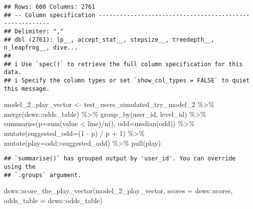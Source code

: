 \documentclass[
]{article}
\newenvironment{Shaded}{\begin{snugshade}}{\end{snugshade}}
\newcommand{\AttributeTok}[1]{\textcolor[rgb]{0.77,0.63,0.00}{#1}}
\newcommand{\DecValTok}[1]{\textcolor[rgb]{0.00,0.00,0.81}{#1}}
\newcommand{\FunctionTok}[1]{\textcolor[rgb]{0.00,0.00,0.00}{#1}}
\newcommand{\NormalTok}[1]{#1}
\newcommand{\OtherTok}[1]{\textcolor[rgb]{0.56,0.35,0.01}{#1}}
\newcommand{\SpecialCharTok}[1]{\textcolor[rgb]{0.00,0.00,0.00}{#1}}
\begin{document}
\begin{verbatim}
## Rows: 600 Columns: 2761
## -- Column specification --------------------------------------------------------
## Delimiter: ","
## dbl (2761): lp__, accept_stat__, stepsize__, treedepth__, n_leapfrog__, dive...
## 
## i Use `spec()` to retrieve the full column specification for this data.
## i Specify the column types or set `show_col_types = FALSE` to quiet this message.
\end{verbatim}

\begin{Shaded}
\begin{Highlighting}[]
\NormalTok{model\_2\_play\_vector }\OtherTok{\textless{}{-}}\NormalTok{ test\_users\_simulated\_try\_model\_2 }\SpecialCharTok{\%\textgreater{}\%}
  \FunctionTok{merge}\NormalTok{(dsws}\SpecialCharTok{::}\NormalTok{odds\_table) }\SpecialCharTok{\%\textgreater{}\%} 
  \FunctionTok{group\_by}\NormalTok{(user\_id, level\_id) }\SpecialCharTok{\%\textgreater{}\%}
  \FunctionTok{summarise}\NormalTok{(}\AttributeTok{p=}\FunctionTok{sum}\NormalTok{(value }\SpecialCharTok{\textless{}}\NormalTok{ line)}\SpecialCharTok{/}\FunctionTok{n}\NormalTok{(), }\AttributeTok{odd=}\FunctionTok{median}\NormalTok{(odd)) }\SpecialCharTok{\%\textgreater{}\%}
  \FunctionTok{mutate}\NormalTok{(}\AttributeTok{suggested\_odd=}\NormalTok{(}\DecValTok{1} \SpecialCharTok{{-}}\NormalTok{ p) }\SpecialCharTok{/}\NormalTok{ p }\SpecialCharTok{+} \DecValTok{1}\NormalTok{) }\SpecialCharTok{\%\textgreater{}\%} 
  \FunctionTok{mutate}\NormalTok{(}\AttributeTok{play=}\NormalTok{odd}\SpecialCharTok{\textgreater{}}\NormalTok{suggested\_odd) }\SpecialCharTok{\%\textgreater{}\%} 
  \FunctionTok{pull}\NormalTok{(play)}
\end{Highlighting}
\end{Shaded}

\begin{verbatim}
## `summarise()` has grouped output by 'user_id'. You can override using the
## `.groups` argument.
\end{verbatim}

\begin{Shaded}
\begin{Highlighting}[]
\NormalTok{dsws}\SpecialCharTok{::}\FunctionTok{score\_the\_play\_vector}\NormalTok{(model\_2\_play\_vector, }\AttributeTok{scores =}\NormalTok{ dsws}\SpecialCharTok{::}\NormalTok{scores, }\AttributeTok{odds\_table =}\NormalTok{ dsws}\SpecialCharTok{::}\NormalTok{odds\_table)}
\end{Highlighting}
\end{Shaded}
\end{document}
